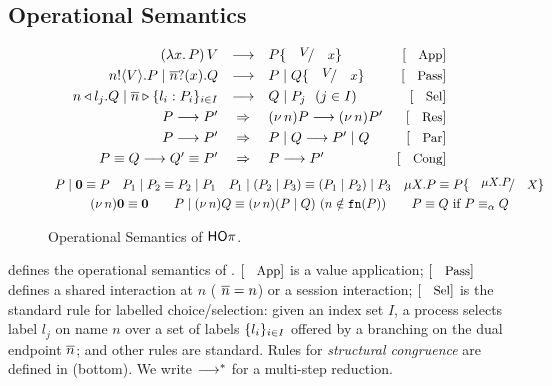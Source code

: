 \subsection{Operational Semantics}
	\label{subsec:semantics}
	\begin{figure}
	\[
		\begin{array}{rclrcrclr}
			(\abs{x}{P}) \, V  & \red & P \subst{V}{x}
			& \orule{App}
			\\[1mm]

			\bout{n}{V} P \Par \binp{\dual{n}}{x} Q & \red & P \Par Q \subst{V}{x} 
			& \orule{Pass}
			\\[1mm]

			\bsel{n}{l_j} Q \Par \bbra{\dual{n}}{l_i : P_i}_{i \in I} & \red & Q \Par P_j ~~(j \in I)~~ 
			& \orule{Sel}
			\\[1mm]

			P \red P' & \Rightarrow & \news{n} P  \red  \news{n} P'  & \orule{Res}
			\\[1mm]
			P \red P' & \Rightarrow  &  P \Par Q  \red   P' \Par Q  & \orule{Par}
			\\[1mm]
			P \scong Q \red Q' \scong P' & \Rightarrow & P  \red  P' & \orule{Cong}
	\end{array}
	\]
\[
	\begin{array}{c}
		P \Par \inact \scong P
		\quad
		P_1 \Par P_2 \scong P_2 \Par P_1
		\quad
		P_1 \Par (P_2 \Par P_3) \scong (P_1 \Par P_2) \Par P_3
		\quad 
		\recp{X}{P} \scong P\subst{\recp{X}{P}}{\rvar{X}}
		\\[1mm]

		\news{n} \inact \scong \inact
		\qquad 
		P \Par \news{n} Q \scong \news{n}(P \Par Q)
		\	(n \notin \fn{P})
		\qquad
		P \scong Q \textrm{ if } P \scong_\alpha Q

	\end{array}
\]
\caption{Operational Semantics of $\mathsf{HO}\pi$. 
\label{fig:reduction}}
\Hlinefig
\end{figure}
\noindent {} defines the operational semantics 
of \HOp.
$\orule{App}$ is a value application; 
$\orule{Pass}$ defines a shared interaction at $n$ 
( $\overline{n}=n$) or a session interaction;  
$\orule{Sel}$ is the standard rule for labelled choice/selection:
given an index set $I$, 
a process selects label $l_j$ on name $n$ over a set of
labels $\{l_i\}_{i \in I}$ offered by a branching 
on the dual endpoint $\overline{n}$; and other rules are standard.
Rules for \emph{structural congruence} are defined in  (bottom). 
We write $\longrightarrow^\ast$ for a multi-step reduction. 
